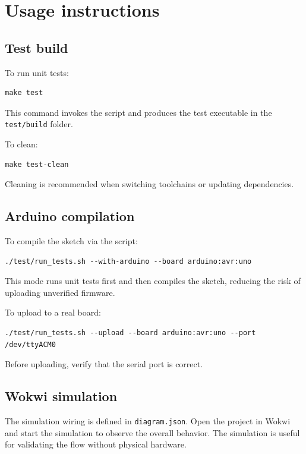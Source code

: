 \chapter{Usage instructions}

\section{Test build}
To run unit tests:
\begin{lstlisting}[style=cppstyle]
make test
\end{lstlisting}
This command invokes the script and produces the test executable in the \texttt{test/build} folder.

To clean:
\begin{lstlisting}[style=cppstyle]
make test-clean
\end{lstlisting}
Cleaning is recommended when switching toolchains or updating dependencies.

\section{Arduino compilation}
To compile the sketch via the script:
\begin{lstlisting}[style=cppstyle]
./test/run_tests.sh --with-arduino --board arduino:avr:uno
\end{lstlisting}
This mode runs unit tests first and then compiles the sketch, reducing the risk of uploading unverified firmware.

To upload to a real board:
\begin{lstlisting}[style=cppstyle]
./test/run_tests.sh --upload --board arduino:avr:uno --port /dev/ttyACM0
\end{lstlisting}
Before uploading, verify that the serial port is correct.

\section{Wokwi simulation}
The simulation wiring is defined in \texttt{diagram.json}. Open the project in Wokwi and start the simulation to observe the overall behavior. The simulation is useful for validating the flow without physical hardware.
